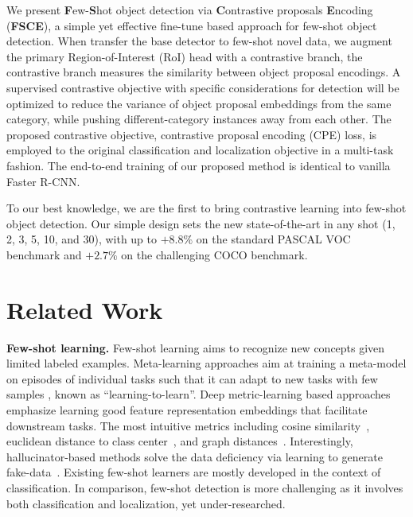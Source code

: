 \documentclass[final]{cvpr}
\begin{document}
We present \textbf{F}ew-\textbf{S}hot object detection via \textbf{C}ontrastive proposals \textbf{E}ncoding (\textbf{FSCE}), a simple yet effective fine-tune based approach for few-shot object detection. When transfer the base detector to few-shot novel data, we augment the primary Region-of-Interest (RoI) head with a contrastive branch, the contrastive branch measures the similarity between object proposal encodings. A supervised contrastive objective with specific considerations for detection will be optimized to reduce the variance of object proposal embeddings from the same category, while pushing different-category instances away from each other. The proposed contrastive objective, contrastive proposal encoding (CPE) loss, is employed to the original classification and localization objective in a multi-task fashion. The end-to-end training of our proposed method is identical to vanilla Faster R-CNN. 

To our best knowledge, we are the first to bring contrastive learning into few-shot object detection. Our simple design sets the new state-of-the-art in any shot (1, 2, 3, 5, 10, and 30), with up to $+8.8\%$ on the standard PASCAL VOC benchmark and $+2.7\%$ on the challenging COCO benchmark.


\section{Related Work}

\textbf{Few-shot learning.} Few-shot learning aims to recognize new concepts given limited labeled examples. Meta-learning approaches aim at training a meta-model on episodes of individual tasks such that it can adapt to new tasks with few samples \cite{finn_model-agnostic_2017,ren_meta-learning_2018,sun_meta-transfer_nodate,khodadadeh_unsupervised_2019,ravi_optimization_2017,nichol_reptile_nodate,rusu_meta-learning_2018}, known as ``learning-to-learn''. Deep metric-learning based approaches emphasize learning good feature representation embeddings that facilitate downstream tasks. The most intuitive metrics including cosine similarity~\cite{cos_face,cos_softmax,chen_closer_2020,deng_arcface_2019}, euclidean distance to class center~\cite{snell_prototypical_2017}, and graph distances~\cite{garcia_few-shot_2018}. Interestingly, hallucinator-based methods solve the data deficiency via learning to generate fake-data~\cite{wang_low-shot_2018}. Existing few-shot learners are mostly developed in the context of classification. In comparison, few-shot detection is more challenging as it involves both classification and localization, yet under-researched.
\end{document}
